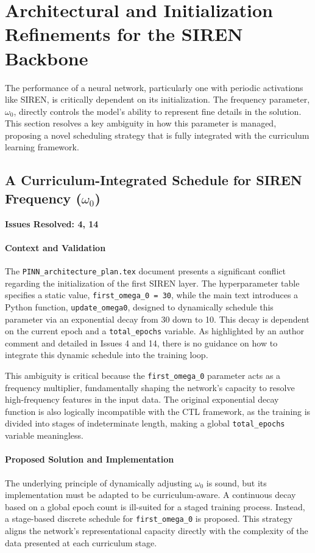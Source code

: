 \section{Architectural and Initialization Refinements for the SIREN Backbone}
The performance of a neural network, particularly one with periodic activations like SIREN, is critically dependent on its initialization. The frequency parameter, $\omega_0$, directly controls the model's ability to represent fine details in the solution. This section resolves a key ambiguity in how this parameter is managed, proposing a novel scheduling strategy that is fully integrated with the curriculum learning framework.

\subsection{A Curriculum-Integrated Schedule for SIREN Frequency (\texorpdfstring{$\omega_0$}{omega\_0})}
\textbf{Issues Resolved: 4, 14}
\paragraph{Context and Validation}
The \texttt{PINN\_architecture\_plan.tex} document presents a significant conflict regarding the initialization of the first SIREN layer. The hyperparameter table specifies a static value, \texttt{first\_omega\_0 = 30}, while the main text introduces a Python function, \texttt{update\_omega0}, designed to dynamically schedule this parameter via an exponential decay from 30 down to 10. This decay is dependent on the current epoch and a \texttt{total\_epochs} variable. As highlighted by an author comment and detailed in Issues 4 and 14, there is no guidance on how to integrate this dynamic schedule into the training loop.

This ambiguity is critical because the \texttt{first\_omega\_0} parameter acts as a frequency multiplier, fundamentally shaping the network's capacity to resolve high-frequency features in the input data. The original exponential decay function is also logically incompatible with the CTL framework, as the training is divided into stages of indeterminate length, making a global \texttt{total\_epochs} variable meaningless.

\paragraph{Proposed Solution and Implementation}
The underlying principle of dynamically adjusting $\omega_0$ is sound, but its implementation must be adapted to be curriculum-aware. A continuous decay based on a global epoch count is ill-suited for a staged training process. Instead, a stage-based discrete schedule for \texttt{first\_omega\_0} is proposed. This strategy aligns the network's representational capacity directly with the complexity of the data presented at each curriculum stage.

